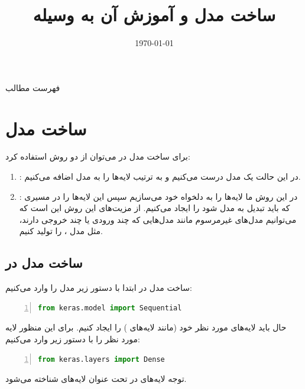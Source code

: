 \documentclass[10pt,xcolor=dvipsnames,professionalfont]{beamer}
\title{ساخت مدل و آموزش آن به وسیله \lr{Keras}}
\author[علیرضا بیکی]{\co{علیرضا بیکی}
}
\institute{دانشگاه شیراز}
\date{\today}
\begin{document}
\begin{frame}
\maketitle
\end{frame}

\begin{frame}{فهرست مطالب}
\tableofcontents
\end{frame}


\section{ساخت مدل}


\begin{frame}
برای ساخت مدل در  می‌توان از دو روش استفاده کرد:
\begin{enumerate}
\item
{}: 
در این حالت یک مدل  درست می‌کنیم و به ترتیب لایه‌ها را به مدل اضافه می‌کنیم.
\item
{}: 
در این روش ما لایه‌ها را به دلخواه خود می‌سازیم سپس این لایه‌ها را در مسیری که باید تبدیل به مدل شود را ایجاد می‌کنیم. از مزیت‌های این روش این است که می‌توانیم مدل‌های غیرمرسوم مانند مدل‌هایی که چند ورودی یا چند خروجی دارند، مثل مدل ، را تولید کنیم. 
\end{enumerate}

\end{frame}

\subsection{ساخت مدل  در }
\begin{frame}[fragile]{ساخت مدل  در }
ابتدا با دستور زیر مدل  را وارد می‌کنیم:
\begin{latin}
\begin{lstlisting}[language=Python,frame=single,rulecolor=\color{magenta},numbers=left,numberstyle=\tiny]
from keras.model import Sequential
\end{lstlisting}
\end{latin}

حال باید لایه‌های مورد نظر خود (مانند لایه‌های ) را ایجاد کنیم. برای این منظور لایه‌ مورد نظر را با دستور زیر وارد می‌کنیم:
\begin{latin}
\begin{lstlisting}[language=Python,frame=single,rulecolor=\color{magenta},numbers=left,numberstyle=\tiny]
from keras.layers import Dense
\end{lstlisting}
\end{latin}

\begin{block}{توجه}
لایه‌های  در  تحت عنوان لایه‌های  شناخته می‌شود.
\end{block}

\end{frame}
\end{document}
